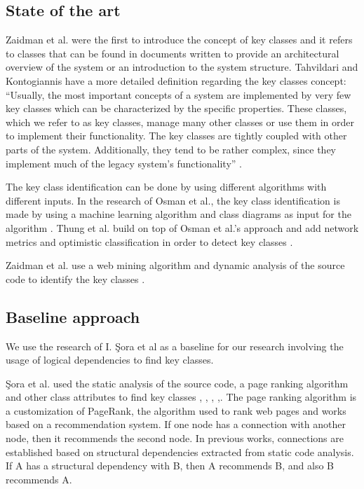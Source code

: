 \documentclass[runningheads]{comsis2}
\begin{document}
\subsection{State of the art}

Zaidman et al. \cite{ZaidmanJurnal} were the first to introduce the concept of key classes and it refers to classes that can be found in documents written to provide an architectural overview of the system or an introduction to the system structure.
Tahvildari and Kontogiannis have a more detailed definition regarding the key classes concept: “Usually, the most important concepts of a system are implemented by very few key classes which can be characterized by the specific properties. These classes, which we refer to as key classes, manage many other classes or use them in order to implement their functionality. The key classes are tightly coupled with other parts of the system. Additionally, they tend to be rather complex, since they implement much of the legacy system’s functionality” \cite{Tahvildari2004ImprovingDQ}.


The key class identification can be done by using different algorithms with different inputs. In the research of Osman et al., the key class identification is made by using a machine learning algorithm and class diagrams as input for the algorithm \cite{6676885}. Thung et al. build on top of Osman et al.’s approach and add network metrics and optimistic classification in order to detect key classes \cite{rocclasification}.

Zaidman et al. use a web mining algorithm and dynamic analysis of the source code to identify the key classes \cite{ZaidmanJurnal}.

\subsection{Baseline approach}
We use the research of I. Şora et al \cite{Finding-key-classes} as a baseline for our research involving the usage of logical dependencies to find key classes. 

Şora et al. used the static analysis of the source code, a page ranking algorithm and other class attributes to find key classes \cite{PagerankENASE}, \cite{enase15}, \cite{SoraSpringer}, \cite{PagerankSACI},\cite{Finding-key-classes}.
The page ranking algorithm is a customization of PageRank, the algorithm used to rank web pages \cite{ilprints422} and works based on a recommendation system. If one node has a connection with another node, then it recommends the second node. In previous works, connections are established based on structural dependencies extracted from static code analysis. If A has a structural dependency with B, then A recommends B, and also B recommends A.
\end{document}
